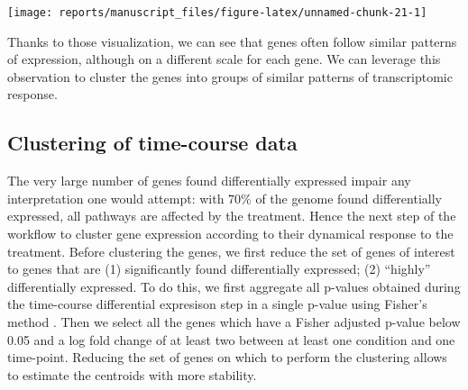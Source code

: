 \documentclass[9pt,a4paper,]{extarticle}
\newenvironment{Shaded}{\begin{snugshade}}{\end{snugshade}}
\newcommand{\DataTypeTok}[1]{\textcolor[rgb]{0.13,0.29,0.53}{#1}}
\newcommand{\DecValTok}[1]{\textcolor[rgb]{0.00,0.00,0.81}{#1}}
\newcommand{\FloatTok}[1]{\textcolor[rgb]{0.00,0.00,0.81}{#1}}
\newcommand{\KeywordTok}[1]{\textcolor[rgb]{0.13,0.29,0.53}{\textbf{#1}}}
\newcommand{\NormalTok}[1]{#1}
\newcommand{\OperatorTok}[1]{\textcolor[rgb]{0.81,0.36,0.00}{\textbf{#1}}}
\newcommand{\OtherTok}[1]{\textcolor[rgb]{0.56,0.35,0.01}{#1}}
\newcommand{\StringTok}[1]{\textcolor[rgb]{0.31,0.60,0.02}{#1}}
\begin{document}
\begin{Shaded}
\end{Shaded}

\begin{center}\texttt{[image: reports/manuscript\_files/figure-latex/unnamed-chunk-21-1]} \end{center}

Thanks to those visualization, we can see that genes often follow similar
patterns of expression, although on a different scale for each gene. We can
leverage this observation to cluster the genes into groups of similar patterns
of transcriptomic response.

\hypertarget{clustering-of-time-course-data}{%
\subsection{Clustering of time-course data}\label{clustering-of-time-course-data}}

The very large number of genes found differentially expressed impair any
interpretation one would attempt: with 70\% of the genome found differentially
expressed, all pathways are affected by the treatment. Hence the next step of
the workflow to cluster gene expression according to their dynamical response
to the treatment. Before clustering the genes, we first reduce the set of
genes of interest to genes that are (1) significantly found differentially
expressed; (2) ``highly'' differentially expressed. To do this, we first
aggregate all p-values obtained during the time-course differential expresison
step in a single p-value using Fisher's method \citep{fisher:statistical}. Then we
select all the genes which have a Fisher adjusted p-value below 0.05 and a log
fold change of at least two between at least one condition and one time-point.
Reducing the set of genes on which to perform the clustering allows to
estimate the centroids with more stability.
\end{document}
